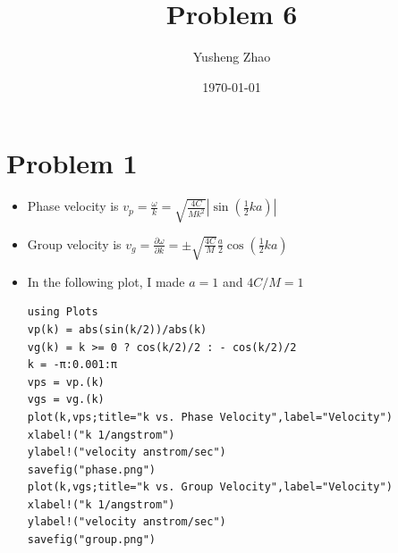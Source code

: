 \documentclass[11pt]{article}
\author{Yusheng Zhao}
\date{\today}
\title{Problem 6}
\begin{document}
\maketitle
\tableofcontents


\section{Problem 1}
\label{sec:orgb5dcc9b}
\begin{itemize}
\item Phase velocity is \(v_{p} = \frac{\omega}{k} = \sqrt{\frac{4C}{Mk^{2}}}|\sin(\frac{1}{2}ka)|\)
\item Group velocity is \(v_{g} = \frac{\partial \omega}{\partial k} = \pm \sqrt{\frac{4C}{M}}\frac{a}{2} \cos(\frac{1}{2}ka)\)

\item In the following plot, I made \(a=1\) and \(4C/M=1\)
\begin{verbatim}
using Plots
vp(k) = abs(sin(k/2))/abs(k)
vg(k) = k >= 0 ? cos(k/2)/2 : - cos(k/2)/2
k = -π:0.001:π
vps = vp.(k)
vgs = vg.(k)
plot(k,vps;title="k vs. Phase Velocity",label="Velocity")
xlabel!("k 1/angstrom")
ylabel!("velocity anstrom/sec")
savefig("phase.png")
plot(k,vgs;title="k vs. Group Velocity",label="Velocity")
xlabel!("k 1/angstrom")
ylabel!("velocity anstrom/sec")
savefig("group.png")
\end{verbatim}
\end{itemize}
\end{document}
